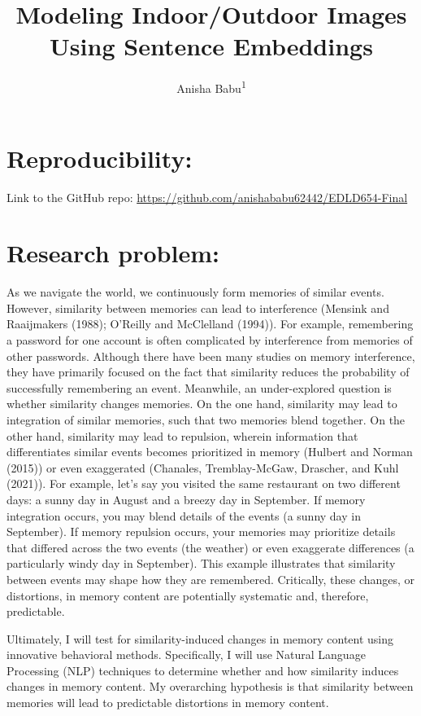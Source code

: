 \documentclass[
  english,
  man]{apa6}
\title{Modeling Indoor/Outdoor Images Using Sentence Embeddings}
\author{Anisha Babu\textsuperscript{1}}
\date{}
\affiliation{\vspace{0.5cm}\textsuperscript{1} University of Oregon}
\begin{document}
\maketitle

\hypertarget{reproducibility}{%
\section{Reproducibility:}\label{reproducibility}}

Link to the GitHub repo: \url{https://github.com/anishababu62442/EDLD654-Final}

\hypertarget{research-problem}{%
\section{Research problem:}\label{research-problem}}

As we navigate the world, we continuously form memories of similar events. However, similarity between memories can lead to interference (Mensink and Raaijmakers (1988); O'Reilly and McClelland (1994)). For example, remembering a password for one account is often complicated by interference from memories of other passwords. Although there have been many studies on memory interference, they have primarily focused on the fact that similarity reduces the probability of successfully remembering an event. Meanwhile, an under-explored question is whether similarity changes memories. On the one hand, similarity may lead to integration of similar memories, such that two memories blend together. On the other hand, similarity may lead to repulsion, wherein information that differentiates similar events becomes prioritized in memory (Hulbert and Norman (2015)) or even exaggerated (Chanales, Tremblay-McGaw, Drascher, and Kuhl (2021)). For example, let's say you visited the same restaurant on two different days: a sunny day in August and a breezy day in September. If memory integration occurs, you may blend details of the events (a sunny day in September). If memory repulsion occurs, your memories may prioritize details that differed across the two events (the weather) or even exaggerate differences (a particularly windy day in September). This example illustrates that similarity between events may shape how they are remembered. Critically, these changes, or distortions, in memory content are potentially systematic and, therefore, predictable.

Ultimately, I will test for similarity-induced changes in memory content using innovative behavioral methods. Specifically, I will use Natural Language Processing (NLP) techniques to determine whether and how similarity induces changes in memory content. My overarching hypothesis is that similarity between memories will lead to predictable distortions in memory content.
\end{document}
